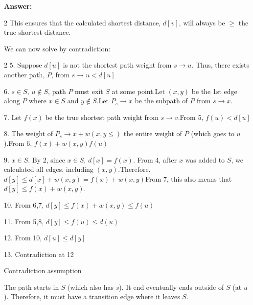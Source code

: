 \documentclass[11pt]{article}
\newenvironment{questions}
  {\begin{enumerate}}
  {\end{enumerate}}
\newenvironment{answer}
  {\vspace{0.5em}\noindent\textbf{Answer:}\par}
  {\vspace{1em}}
\newenvironment{answercols}
  {\begin{multicols}{2}}
  {\end{multicols}}
\begin{document}
\begin{questions}
\begin{answer}
\begin{answercols}
                This ensures that the calculated shortest distance, $d[v]$, will always be $\geq$ the true shortest distance.
            \end{answercols}

            We can now solve by contradiction:
            \pagebreak

            \begin{answercols}
                5. Suppose $d[u]$ is not the shortest path weight from $s \to u$. Thus, there exists another path, $P$, from $s \to u<d[u]$

                6. $s\in S$, $u \notin S$, path $P$ must exit $S$ at some point.\newline\newline Let $(x,y)$ be the 1st edge along $P$ where $x \in S$ and $y \notin S$.\newline\newline Let $P_s \to x$ be the subpath of $P$ from $s \to x$.

                7. Let $f(x)$ be the true shortest path weight from $s \to v$.\newline\newline From 5, $f(u)<d[u]$

                8. The weight of $P_s \to x+w(x, y \leq)$ the entire weight of $P$ (which goes to $u$).\newline\newline  From 6, $f(x)+w(x, y)f(u)$

                9. $x \in S$. By 2, since $x \in S$, $d[x]=f(x)$. From 4, after $x$ was added to $S$, we calculated all edges, including $(x, y)$.\newline\newline Therefore, $d[y] \leq d[x]+w(x,y)=f(x)+w(x,y)$\newline\newline From 7, this also means that $d[y] \leq f(x)+w(x,y)$.

                10. From 6,7, $d[y] \leq f(x)+w(x, y) \leq f(u)$

                11. From 5,8, $d[y] \leq f(u) \leq d(u)$

                12. From 10, $d[u] \leq d[y]$

                13. Contradiction at 12

                \columnbreak

                Contradiction assumption

                The path starts in $S$ (which also has $s$). It end eventually ends outside of $S$ (at $u$). Therefore, it must have a transition edge where it leaves $S$.


\end{answercols}
\end{answer}
\end{questions}
\end{document}
